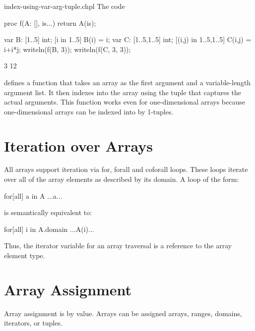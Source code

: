 \begin{chapelexample}{index-using-var-arg-tuple.chpl}
The code
\begin{chapel}
proc f(A: [], is...)
  return A(is);
\end{chapel}
\begin{chapelpost}
var B: [1..5] int;
[i in 1..5] B(i) = i;
var C: [1..5,1..5] int;
[(i,j) in {1..5,1..5}] C(i,j) = i+i*j;
writeln(f(B, 3));
writeln(f(C, 3, 3));
\end{chapelpost}
\begin{chapeloutput}
3
12
\end{chapeloutput}
defines a function that takes an array as the first argument and a
variable-length argument list.  It then indexes into the array using
the tuple that captures the actual arguments.  This function works
even for one-dimensional arrays because one-dimensional arrays can be
indexed into by 1-tuples.
\end{chapelexample}


\section{Iteration over Arrays}
\label{Iteration_over_Arrays}

All arrays support iteration via for, forall and coforall loops.
These loops iterate over all of the array elements as described by its
domain.  A loop of the form:

\begin{chapel}
[co]for[all] a in A
  ...a...
\end{chapel}

is semantically equivalent to:

\begin{chapel}
[co]for[all] i in A.domain
  ...A(i)...
\end{chapel}

Thus, the iterator variable for an array traversal is a reference to
the array element type.


\section{Array Assignment}
\label{Array_Assignment}

Array assignment is by value.  Arrays can be assigned arrays, ranges,
domains, iterators, or tuples.


